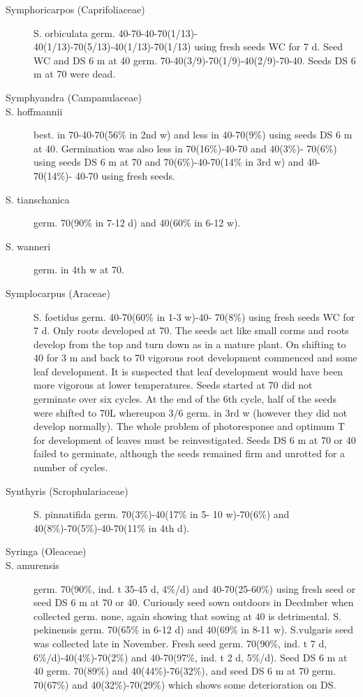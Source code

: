 \begin{description}
\item[Symphoricarpos (Caprifoliaceae)] S. orbiculata germ. 40-70-40-70(1/13)-
40(1/13)-70(5/13)-40(1/13)-70(1/13) using fresh seeds WC for 7 d. Seed WC and DS
6 m at 40 germ. 70-40(3/9)-70(1/9)-40(2/9)-70-40. Seeds DS 6 m at 70 were dead.
\item[Symphyandra (Campanulaceae)]
\item[S. hoffmannii] best. in 70-40-70(56\% in 2nd w) and less in 40-70(9\%) using
seeds DS 6 m at 40. Germination was also less in 70(16\%)-40-70 and 40(3\%)-
70(6\%) using seeds DS 6 m at 70 and 70(6\%)-40-70(14\% in 3rd w) and 40-70(14\%)-
40-70 using fresh seeds.
\item[S. tianschanica] germ. 70(90\% in 7-12 d) and 40(60\% in 6-12 w).
\item[S. wanneri] germ. in 4th w at 70.

\item[Symplocarpus (Araceae)] S. foetidus germ. 40-70(60\% in 1-3 w)-40-
70(8\%) using fresh seeds WC for 7 d. Only roots developed at 70. The seeds act like
small corms and roots develop from the top and turn down as in a mature plant. On
shifting to 40 for 3 m and back to 70 vigorous root development commenced and some
leaf development. It is suspected that leaf development would have been more
vigorous at lower temperatures. Seeds started at 70 did not germinate over six cycles.
At the end of the 6th cycle, half of the seeds were shifted to 70L whereupon 3/6 germ.
in 3rd w (however they did not develop normally). The whole problem of
photoresponse and optimum T for development of leaves must be reinvestigated.
Seeds DS 6 m at 70 or 40 failed to germinate, although the seeds remained firm and
unrotted for a number of cycles.

\item[Synthyris (Scrophulariaceae)] S. pinnatifida germ. 70(3\%)-40(17\% in 5-
10 w)-70(6\%) and 40(8\%)-70(5\%)-40-70(11\% in 4th d).

\item[Syringa (Oleaceae)]
\item[S. amurensis] germ. 70(90\%, ind. t 35-45 d, 4\%/d) and 40-70(25-60\%) using
fresh seed or seed DS 6 m at 70 or 40. Curiously seed sown outdoors in Decdmber
when collected germ. none, again showing that sowing at 40 is detrimental.
S. pekinensis germ. 70(65\% in 6-12 d) and 40(69\% in 8-11 w).
S.vulgaris seed was collected late in November. Fresh seed germ. 70(90\%,
ind. t 7 d, 6\%/d)-40(4\%)-70(2\%) and 40-70(97\%, ind. t 2 d, 5\%/d). Seed DS 6 m at 40
germ. 70(89\%) and 40(44\%)-76(32\%), and seed DS 6 m at 70 germ. 70(67\%) and
40(32\%)-70(29\%) which shows some deterioration on DS.
\end{description}

